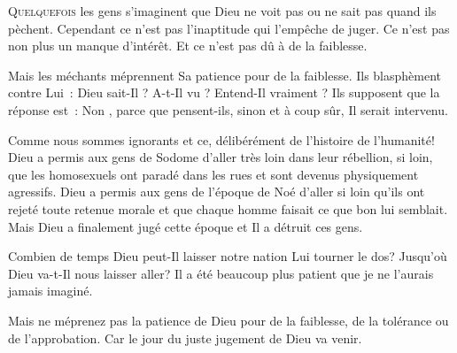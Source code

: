 

\lettrine{Q}{uelquefois} les gens s'imaginent que Dieu ne voit pas
 ou ne sait pas quand ils pèchent.
 Cependant ce n'est pas l'inaptitude qui l'empêche de juger.
 Ce n'est pas non plus un manque d'intérêt.
 Et ce n'est pas dû à de la faiblesse.


Mais les méchants méprennent Sa patience pour de la faiblesse.
 Ils blasphèment contre Lui~:
 \Og Dieu sait-Il ? A-t-Il vu ? Entend-Il vraiment ? \Fg{}
 Ils supposent que la réponse est~: \Og Non \Fg{},
 parce que pensent-ils, sinon et à coup sûr, Il serait intervenu.

Comme nous sommes ignorants \ocadr et ce, délibérément \fcadr{}
 de l'histoire de l'humanité!
 Dieu a permis aux gens de Sodome d'aller très loin dans leur rébellion,
 si loin, que les homosexuels ont paradé dans les rues et sont devenus
 physiquement agressifs.
 Dieu a permis aux gens de l'époque de Noé d'aller si loin qu'ils ont
 rejeté toute retenue morale et que chaque homme faisait ce que bon
 lui semblait.
 Mais Dieu a finalement jugé cette époque et Il a détruit ces gens.

Combien de temps Dieu peut-Il laisser notre nation Lui tourner le dos?
 Jusqu'où Dieu va-t-Il nous laisser aller?
 Il a été beaucoup plus patient que je ne l'aurais jamais imaginé.

Mais ne méprenez pas la patience de Dieu pour de la faiblesse,
 de la tolérance ou de l'approbation.
 Car le jour du juste jugement de Dieu va venir.

\dvrule





